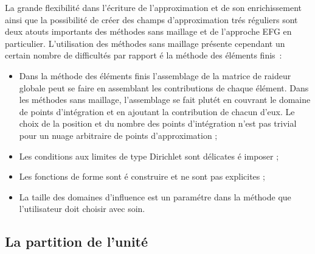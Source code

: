 La grande flexibilit\'e dans l'\'ecriture de l'approximation et
de son enrichissement ainsi que la possibilit\'e de cr\'eer des champs
d'approximation tr\'es r\'eguliers sont deux atouts importants des
m\'ethodes sans maillage et de l'approche EFG en particulier.
L'utilisation des m\'ethodes sans maillage pr\'esente cependant un
certain nombre de difficult\'es par rapport \'e la m\'ethode des
\'el\'ements finis~:
\begin{itemize}
\item Dans la m\'ethode des \'el\'ements finis l'assemblage de la
  matrice de raideur globale peut se faire en assemblant les
  contributions de chaque \'el\'ement. Dans les m\'ethodes sans
  maillage, l'assemblage se fait plut\'et en couvrant le domaine de
  points d'int\'egration et en ajoutant la contribution de chacun
  d'eux.  Le choix de la position et du nombre des points
  d'int\'egration n'est pas trivial pour un nuage arbitraire de points
  d'approximation ;
\item Les conditions aux limites de type Dirichlet sont d\'elicates \'e
  imposer ;
\item Les fonctions de forme sont \'e construire et ne sont pas
  explicites ;
\item La taille des domaines d'influence est un param\'etre dans la
  m\'ethode que l'utilisateur doit choisir avec soin.
\end{itemize}




\subsection{La partition de l'unit\'e}\label{partition_de_l_unite}

